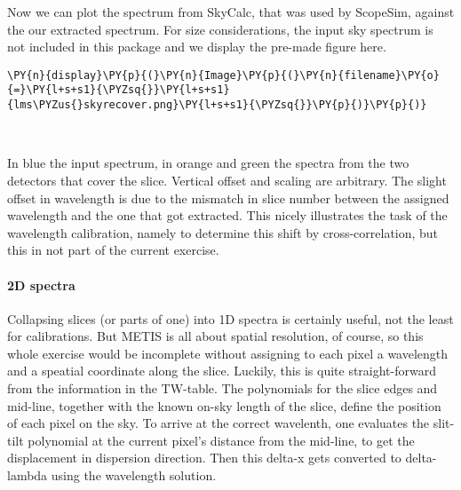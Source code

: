 Now we can plot the spectrum from SkyCalc, that was used by ScopeSim,
against the our extracted spectrum. For size considerations, the input
sky spectrum is not included in this package and we display the pre-made
figure here.

    \begin{tcolorbox}[breakable, size=fbox, boxrule=1pt, pad at break*=1mm,colback=cellbackground, colframe=cellborder]
\begin{Verbatim}[commandchars=\\\{\}]
\PY{n}{display}\PY{p}{(}\PY{n}{Image}\PY{p}{(}\PY{n}{filename}\PY{o}{=}\PY{l+s+s1}{\PYZsq{}}\PY{l+s+s1}{lms\PYZus{}skyrecover.png}\PY{l+s+s1}{\PYZsq{}}\PY{p}{)}\PY{p}{)}
\end{Verbatim}
\end{tcolorbox}

\begin{center}
\end{center}
{ \hspace*{\fill} \\}

In blue the input spectrum, in orange and green the spectra from the two
detectors that cover the slice. Vertical offset and scaling are
arbitrary. The slight offset in wavelength is due to the mismatch in
slice number between the assigned wavelength and the one that got
extracted. This nicely illustrates the task of the wavelength
calibration, namely to determine this shift by cross-correlation, but
this in not part of the current exercise.

\paragraph{2D spectra}
Collapsing slices (or parts of one) into 1D spectra is certainly useful,
not the least for calibrations. But METIS is all about spatial
resolution, of course, so this whole exercise would be incomplete
without assigning to each pixel a wavelength and a speatial coordinate
along the slice. Luckily, this is quite straight-forward from the
information in the TW-table. The polynomials for the slice edges and
mid-line, together with the known on-sky length of the slice, define the
position of each pixel on the sky. To arrive at the correct wavelenth,
one evaluates the slit-tilt polynomial at the current pixel's distance
from the mid-line, to get the displacement in dispersion direction. Then
this delta-x gets converted to delta-lambda using the wavelength
solution.

